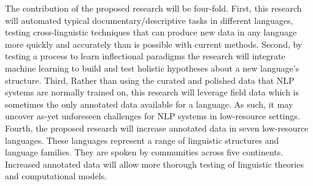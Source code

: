 The contribution of the proposed research will be four-fold. First, this research will automated typical documentary/descriptive tasks in different languages, testing cross-linguistic techniques that can produce new data in any language more quickly and accurately than is possible with current methods. Second, by testing a process to learn inflectional paradigms the research will integrate machine learning to build and test holistic hypotheses about a new language's structure. Third, Rather than using the curated and polished data that NLP systems are normally trained on, this research will leverage field data which is sometimes the only annotated data available for a language. As such, it may uncover as-yet unforeseen challenges for NLP systems in low-resource settings. 
Fourth, the proposed research will increase annotated data in seven low-resource languages. These languages represent a range of linguistic structures and language families. They are spoken by communities across five continents. Increased annotated data will allow more thorough testing of linguistic theories and computational models.




